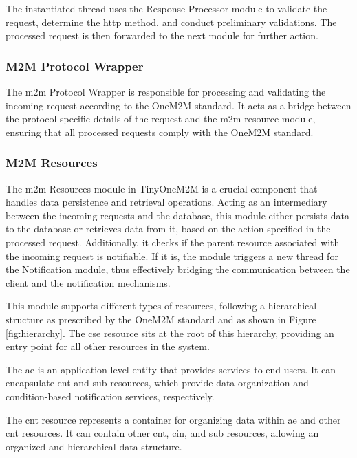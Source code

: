 \documentclass[a4paper,fleqn]{cas-dc}
\begin{document}
The instantiated thread uses the Response Processor module to validate the request, determine the \gls{http} method, and conduct preliminary validations. The processed request is then forwarded to the next module for further action.

\subsubsection{M2M Protocol Wrapper}

The \gls{m2m} Protocol Wrapper is responsible for processing and validating the incoming request according to the OneM2M standard. It acts as a bridge between the protocol-specific details of the request and the \gls{m2m} resource module, ensuring that all processed requests comply with the OneM2M standard.

\subsubsection{M2M Resources}\label{sec:M2MResource}

The \gls{m2m} Resources module in TinyOneM2M is a crucial component that handles data persistence and retrieval operations. Acting as an intermediary between the incoming requests and the database, this module either persists data to the database or retrieves data from it, based on the action specified in the processed request. Additionally, it checks if the parent resource associated with the incoming request is notifiable. If it is, the module triggers a new thread for the Notification module, thus effectively bridging the communication between the client and the notification mechanisms.

This module supports different types of resources, following a hierarchical structure as prescribed by the OneM2M standard and as shown in Figure \ref{fig:hierarchy}. The \gls{cse} resource sits at the root of this hierarchy, providing an entry point for all other resources in the system.

The \gls{ae} is an application-level entity that provides services to end-users. It can encapsulate \gls{cnt} and \gls{sub} resources, which provide data organization and condition-based notification services, respectively.

The \gls{cnt} resource represents a container for organizing data within \gls{ae} and other \gls{cnt} resources. It can contain other \gls{cnt}, \gls{cin}, and \gls{sub} resources, allowing an organized and hierarchical data structure.
\end{document}
